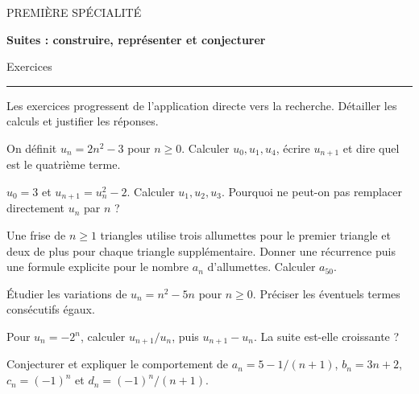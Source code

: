 \documentclass[11pt,a4paper]{article}
\begin{document}
{\small\color{Blue}PREMIÈRE SPÉCIALITÉ}\par{\LARGE\bfseries Suites : construire, représenter et conjecturer}\par{\large Exercices}\par\vspace{0.2cm}\hrule\vspace{0.4cm}
Les exercices progressent de l’application directe vers la recherche. Détailler les calculs et justifier les réponses.
\par\noindent\begin{minipage}{\linewidth}
On définit $u_n=2n^2-3$ pour $n\ge0$. Calculer $u_0,u_1,u_4$, écrire $u_{n+1}$ et dire quel est le quatrième terme.
\end{minipage}\par
\par\noindent\begin{minipage}{\linewidth}
$u_0=3$ et $u_{n+1}=u_n^2-2$. Calculer $u_1,u_2,u_3$. Pourquoi ne peut-on pas remplacer directement $u_n$ par $n$ ?
\end{minipage}\par
\par\noindent\begin{minipage}{\linewidth}
Une frise de $n\ge1$ triangles utilise trois allumettes pour le premier triangle et deux de plus pour chaque triangle supplémentaire. Donner une récurrence puis une formule explicite pour le nombre $a_n$ d’allumettes. Calculer $a_{50}$.
\end{minipage}\par
\par\noindent\begin{minipage}{\linewidth}
Étudier les variations de $u_n=n^2-5n$ pour $n\ge0$. Préciser les éventuels termes consécutifs égaux.
\end{minipage}\par
\par\noindent\begin{minipage}{\linewidth}
Pour $u_n=-2^n$, calculer $u_{n+1}/u_n$, puis $u_{n+1}-u_n$. La suite est-elle croissante ?
\end{minipage}\par
\par\noindent\begin{minipage}{\linewidth}
Conjecturer et expliquer le comportement de $a_n=5-1/(n+1)$, $b_n=3n+2$, $c_n=(-1)^n$ et $d_n=(-1)^n/(n+1)$.
\end{minipage}\par
\end{document}
